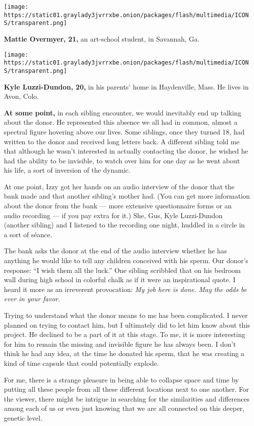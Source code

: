 \texttt{[image: https://static01.graylady3jvrrxbe.onion/packages/flash/multimedia/ICONS/transparent.png]}

\textbf{Mattie Overmyer, 21,} an art-school student, in Savannah, Ga.

\texttt{[image: https://static01.graylady3jvrrxbe.onion/packages/flash/multimedia/ICONS/transparent.png]}

\textbf{Kyle Luzzi-Dundon, 20,} in his parents' home in Haydenville,
Mass. He lives in Avon, Colo.

\textbf{At some point,} in each sibling encounter, we would inevitably
end up talking about the donor. He represented this absence we all had
in common, almost a spectral figure hovering above our lives. Some
siblings, once they turned 18, had written to the donor and received
long letters back. A different sibling told me that although he wasn't
interested in actually contacting the donor, he wished he had the
ability to be invisible, to watch over him for one day as he went about
his life, a sort of inversion of the dynamic.

At one point, Izzy got her hands on an audio interview of the donor that
the bank made and that another sibling's mother had. (You can get more
information about the donor from the bank --- more extensive
questionnaire forms or an audio recording --- if you pay extra for it.)
She, Gus, Kyle Luzzi-Dundon (another sibling) and I listened to the
recording one night, huddled in a circle in a sort of séance.

The bank asks the donor at the end of the audio interview whether he has
anything he would like to tell any children conceived with his sperm.
Our donor's response: ``I wish them all the luck.'' One sibling
scribbled that on his bedroom wall during high school in colorful chalk
as if it were an inspirational quote. I heard it more as an irreverent
provocation: \emph{My job here is done. May the odds be ever in your
favor.}

Trying to understand what the donor means to me has been complicated. I
never planned on trying to contact him, but I ultimately did to let him
know about this project. He declined to be a part of it at this stage.
To me, it is more interesting for him to remain the missing and
invisible figure he has always been. I don't think he had any idea, at
the time he donated his sperm, that he was creating a kind of time
capsule that could potentially explode.

For me, there is a strange pleasure in being able to collapse space and
time by putting all these people from all these different locations next
to one another. For the viewer, there might be intrigue in searching for
the similarities and differences among each of us or even just knowing
that we are all connected on this deeper, genetic level.

